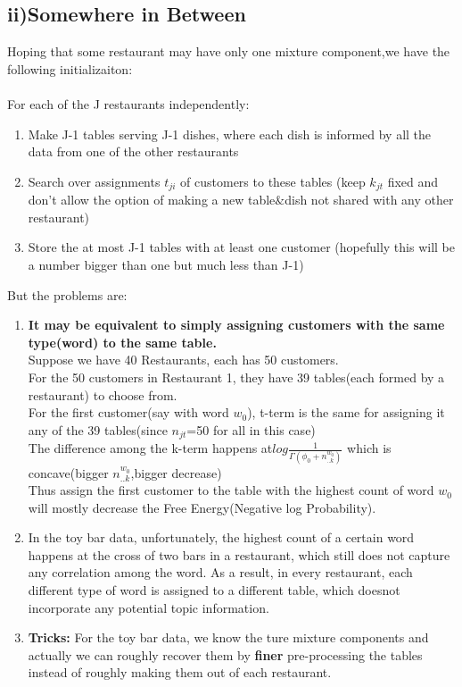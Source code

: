 \documentclass{article}
\begin{document}
\begin{spacing}{1.1}
\subsection{ii)Somewhere in Between}
Hoping that some restaurant may have only one mixture component,we have the following initializaiton:\\ \\
For each of the J restaurants independently:\\
\begin{enumerate}
 
\item Make J-1 tables serving J-1 dishes, where each dish is informed by all the data from one of the other restaurants
\item  Search over assignments $t_{ji}$ of customers to these tables (keep $k_{jt}$ fixed and don't allow the option of making a new table$\&$dish not shared with any other restaurant)
\item  Store the at most J-1 tables with at least one customer (hopefully this will be a number bigger than one but much less than J-1)

\end{enumerate}

But the problems are:\\ 
\begin{enumerate}
\item {\bf It may be equivalent to simply assigning customers with the same type(word) to the same table.} \\
Suppose we have 40 Restaurants, each has 50 customers.\\
For the 50 customers in Restaurant 1, they have 39 tables(each formed by a restaurant) to choose from.\\
For the first customer(say with word $w_{0}$), t-term is the same for assigning it any of the 39 tables(since $n_{jt}$=50 for all in this case)\\
The difference among the k-term happens at$log\frac{1}{\Gamma(\phi_{0}+n_{..k}^{w_{0}})}$ which is concave(bigger $n_{..k}^{w_{0}}$,bigger decrease)\\
Thus assign the first customer to the table with the highest count of word $w_{0}$ will mostly decrease the Free Energy(Negative log Probability).
\item  In the toy bar data, unfortunately, the highest count of a certain word happens at the cross of two bars in a restaurant, which still does not capture
any correlation among the word. As a result, in every restaurant, each different type of word is assigned to a different table, which doesnot 
incorporate any potential topic information.
\item {\bf Tricks:} For the toy bar data, we know the ture mixture components and actually we can roughly recover them by {\bf finer} pre-processing the tables 
instead of roughly making them out of each restaurant.
\end{enumerate}


\end{spacing}
\end{document}
